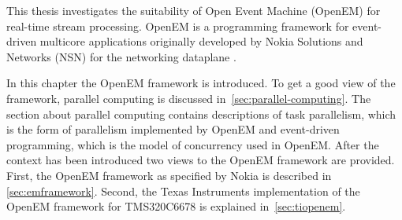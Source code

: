This thesis investigates the suitability of Open Event Machine (OpenEM) for real-time stream processing. OpenEM is a programming framework for event-driven multicore applications originally developed by Nokia Solutions and Networks (NSN) for the networking dataplane \cite{openemintro}.

In this chapter the OpenEM framework is introduced. To get a good view of the framework, parallel computing is discussed in~\ref{sec:parallel-computing}. The section about parallel computing contains descriptions of task parallelism, which is the form of parallelism implemented by OpenEM and event-driven programming, which is the model of concurrency used in OpenEM. After the context has been introduced two views to the OpenEM framework are provided. First, the OpenEM framework as specified by Nokia is described in \ref{sec:emframework}. Second, the Texas Instruments implementation of the OpenEM framework for TMS320C6678 is explained in~\ref{sec:tiopenem}.
